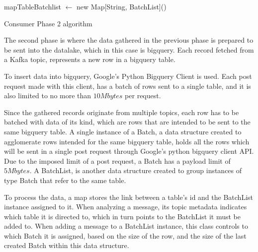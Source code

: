 \IncMargin{1em} 
\begin{algorithm}[h]
    \BlankLine

    mapTableBatchlist $\leftarrow$ new Map[String, BatchList]()\; 
\caption{Consumer Phase 2 algorithm}
\label{algo:phase_2} 
\end{algorithm} 
\DecMargin{1em}

The second phase is where the data gathered in the previous phase is prepared to
be sent into the datalake, which in this case is bigquery. Each record fetched
from a Kafka topic, represents a new row in a bigquery table. 

To insert data into bigquery, Google's Python Bigquery Client is used. Each post
request made with this client, has a batch of rows sent to a single table, and
it is also limited to no more than $10Mbytes$ per request.

Since the gathered records originate from multiple topics, each row has to be
batched with data of its kind, which are rows that are intended to be sent to
the same bigquery table.  A single instance of a Batch, a data structure created
to agglomerate rows intended for the same bigquery table, holds all the rows
which will be sent in a single post request through Google's python bigquery
client API. Due to the imposed limit of a post request, a Batch has a payload
limit of $5 Mbytes$.  A BatchList, is another data structure created to group
instances of type Batch that refer to the same table.

To process the data, a map stores the link between a table's id and the
BatchList instance assigned to it. When analyzing a message, its topic metadata
indicates which table it is directed to, which in turn points to the BatchList
it must be added to.  When adding a message to a BatchList instance, this class
controls to which Batch it is assigned, based on the size of the row, and the
size of the last created Batch within this data structure.

